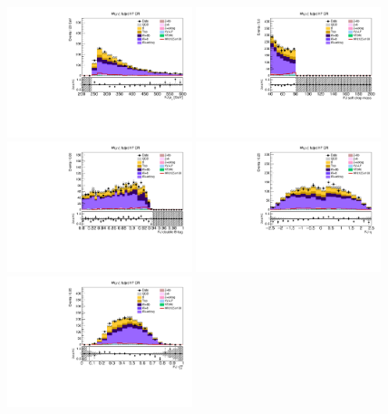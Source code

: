 \begin{figure}[tbp]
  \begin{center}
    \includegraphics[width=0.48\textwidth]{figures/wlnhbb2016/boosted/WmnWHHeavyFlavorFJCR_fj1Pt.pdf}
    \includegraphics[width=0.48\textwidth]{figures/wlnhbb2016/boosted/WmnWHHeavyFlavorFJCR_fj1MSD_corr.pdf}
    \includegraphics[width=0.48\textwidth]{figures/wlnhbb2016/boosted/WmnWHHeavyFlavorFJCR_fj1DoubleCSV.pdf}
    \includegraphics[width=0.48\textwidth]{figures/wlnhbb2016/boosted/WmnWHHeavyFlavorFJCR_fj1Eta.pdf}
    \includegraphics[width=0.48\textwidth]{figures/wlnhbb2016/boosted/WmnWHHeavyFlavorFJCR_fj1Tau21SD.pdf}

\end{center}
\end{figure}
